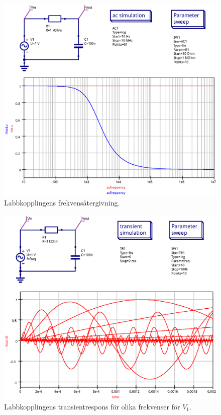 \begin{figure}
    \centering
    \includegraphics[width=\linewidth]{sim/ee466_lab-4_prj/uppgift-1_ac}
    \caption[] {Labbkopplingens frekvensåtergivning.}
    \label{bode-sim-ac}
\end{figure}

\begin{figure}[ht]
    \centering
    \includegraphics[width=\linewidth]{sim/ee466_lab-4_prj/uppgift-1_tran}
    \caption[] {Labbkopplingens transientrespons för olika frekvenser för $V_1$.}
    \label{bode-sim-tran}
\end{figure}

